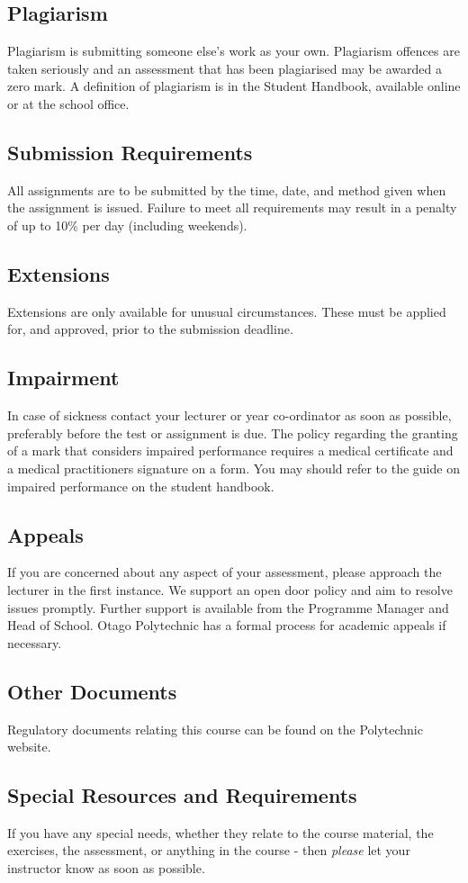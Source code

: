 \documentclass{article}
\begin{document}
\subsection*{Plagiarism}
Plagiarism is submitting someone else's work as your own.  Plagiarism offences are taken seriously and an
assessment that has been plagiarised may be awarded a zero mark.  A definition of plagiarism is in the Student Handbook,
available online or at the school office.

\subsection*{Submission Requirements}
All assignments are to be submitted by the time, date, and method given when the assignment is issued.
Failure to meet all requirements may result in a penalty of up to 10\% per day (including
weekends).

\subsection*{Extensions}
Extensions are only available for unusual circumstances.  These must be applied for, and approved, prior to the submission deadline.

\subsection*{Impairment}
In case of sickness contact your lecturer or year co-ordinator as soon as possible, preferably before the test or
assignment is due.  The policy regarding the granting of a mark that considers impaired performance requires a medical
certificate and a medical practitioners signature on a form. You may should refer to the guide on impaired performance
on the student handbook.

\subsection*{Appeals}
If you are concerned about any aspect of your assessment, please approach the lecturer in the first instance.  We support
an open door policy and aim to resolve issues promptly.  Further support is available from the Programme
Manager and Head of School. Otago Polytechnic has a formal process for academic appeals if necessary.

\subsection*{Other Documents}
Regulatory documents relating this course can be found on the Polytechnic website.

\subsection*{Special Resources and Requirements}
If you have any special needs, whether they relate to the course material, the exercises, the assessment, or anything in the course -
then \textit{please} let your instructor know as soon as possible.
\end{document}
